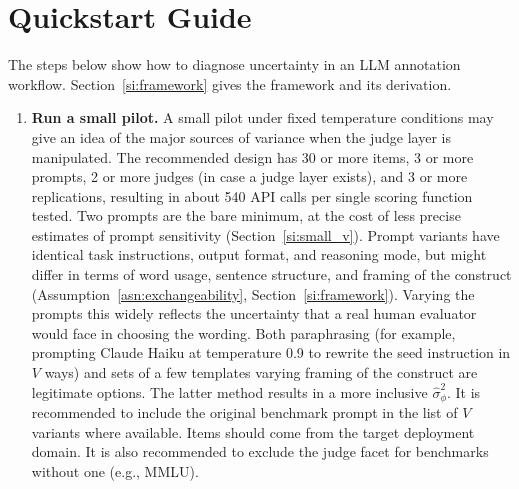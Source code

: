 

\section{Quickstart Guide}
\label{si:quickstart}

The steps below show how to diagnose uncertainty in an LLM annotation workflow. Section~\ref{si:framework} gives the framework and its derivation.

\begin{enumerate}\setlength{\itemsep}{6pt}
\item \textbf{Run a small pilot.} A small pilot under fixed temperature conditions may give an idea of the major sources of variance when the judge layer is manipulated. The recommended design has 30 or more items, 3 or more prompts, 2 or more judges (in case a judge layer exists), and 3 or more replications, resulting in about 540 API calls per single scoring function tested. Two prompts are the bare minimum, at the cost of less precise estimates of prompt sensitivity (Section~\ref{si:small_v}). Prompt variants have identical task instructions, output format, and reasoning mode, but might differ in terms of word usage, sentence structure, and framing of the construct (Assumption~\ref{asn:exchangeability}, Section~\ref{si:framework}). Varying the prompts this widely reflects the uncertainty that a real human evaluator would face in choosing the wording. Both paraphrasing (for example, prompting Claude Haiku at temperature 0.9 to rewrite the seed instruction in $V$ ways) and sets of a few templates varying framing of the construct are legitimate options. The latter method results in a more inclusive $\hat{\sigma}^2_\phi$. It is recommended to include the original benchmark prompt in the list of $V$ variants where available. Items should come from the target deployment domain. It is also recommended to exclude the judge facet for benchmarks without one (e.g., MMLU).


\end{enumerate}
